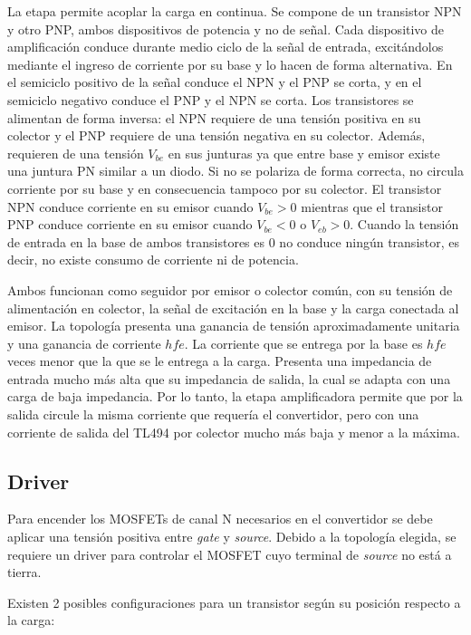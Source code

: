 La etapa permite acoplar la carga en continua. 
Se compone de un transistor NPN y otro PNP, ambos dispositivos de potencia y no de señal. 
Cada dispositivo de amplificación conduce durante medio ciclo de la señal de entrada, 
excitándolos mediante el ingreso de corriente por su base y lo hacen de forma alternativa. 
En el semiciclo positivo de la señal conduce el NPN y el PNP se corta, y en el semiciclo negativo conduce el PNP y el NPN se corta. 
Los transistores se alimentan de forma inversa: el NPN requiere de una tensión positiva en su colector y el PNP requiere de una tensión negativa en su colector.
Además, requieren de una tensión $V_{be}$ en sus junturas ya que entre base y emisor existe una juntura PN similar a un diodo. 
Si no se polariza de forma correcta, no circula corriente por su base y en consecuencia tampoco por su colector. 
El transistor NPN conduce corriente en su emisor cuando $V_{be}>0$ mientras que el transistor PNP conduce corriente en su emisor cuando $V_{be}<0$ o $V_{eb}>0$.
Cuando la tensión de entrada en la base de ambos transistores es 0 no conduce ningún transistor, es decir, no existe consumo de corriente ni de potencia. 

Ambos funcionan como seguidor por emisor o colector común, con su tensión de alimentación en colector, la señal de excitación en la base y la carga conectada al emisor. 
La topología presenta una ganancia de tensión aproximadamente unitaria y una ganancia de corriente $hfe$. 
La corriente que se entrega por la base es $hfe$ veces menor que la que se le entrega a la carga. 
Presenta una impedancia de entrada mucho más alta que su impedancia de salida, la cual se adapta con una carga de baja impedancia. 
Por lo tanto, la etapa amplificadora permite que por la salida circule la misma corriente que requería el convertidor, pero con una corriente de salida del TL494 por colector mucho más baja y menor a la máxima. 

\subsection{Driver}

Para encender los MOSFETs de canal N necesarios en el convertidor se debe aplicar una tensión positiva entre \textit{gate} y \textit{source}. 
Debido a la topología elegida, se requiere un driver para controlar el MOSFET cuyo terminal de \textit{source} no está a tierra.

Existen 2 posibles configuraciones para un transistor según su posición respecto a la carga:

